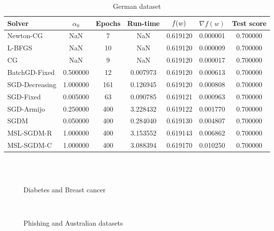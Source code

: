 \begin{table}
\caption{German dataset}
\label{tab:german-tab}
\centering
\begin{tabular}{lS[round-precision=3]S[drop-zero-decimal]S[round-precision=4]S[round-precision=6]S[exponent-mode=scientific]S[round-precision=6]}
\toprule
Solver & {$\alpha_0$} & {Epochs} & {Run-time} & {$\operatorname*{\mathit{f}}(w)$} & {$\nabla f(w)$} & {Test score} \\
\midrule
Newton-CG & NaN & 7 & NaN & 0.619120 & 0.000001 & 0.700000 \\
L-BFGS & NaN & 10 & NaN & 0.619120 & 0.000009 & 0.700000 \\
CG & NaN & 9 & NaN & 0.619120 & 0.000017 & 0.700000 \\
BatchGD-Fixed & 0.500000 & 12 & 0.007973 & 0.619120 & 0.000613 & 0.700000 \\
SGD-Decreasing & 1.000000 & 161 & 0.126945 & 0.619120 & 0.000808 & 0.700000 \\
SGD-Fixed & 0.005000 & 63 & 0.090785 & 0.619121 & 0.000963 & 0.700000 \\
SGD-Armijo & 0.250000 & 400 & 3.228432 & 0.619122 & 0.001770 & 0.700000 \\
SGDM & 0.050000 & 400 & 0.284040 & 0.619130 & 0.004807 & 0.700000 \\
MSL-SGDM-R & 1.000000 & 400 & 3.153552 & 0.619143 & 0.006862 & 0.700000 \\
MSL-SGDM-C & 1.000000 & 400 & 3.088394 & 0.619170 & 0.010250 & 0.700000 \\
\bottomrule
\end{tabular}
\end{table}

\begin{figure}
\centering
 \\
 \\
\caption[]{Diabetes and Breast cancer}
\label{fig:diab-breast}
\end{figure}

\begin{figure}
\centering
 \\
\caption[]{Phishing and Australian datasets}
\label{fig:phish-austr}
\end{figure}

